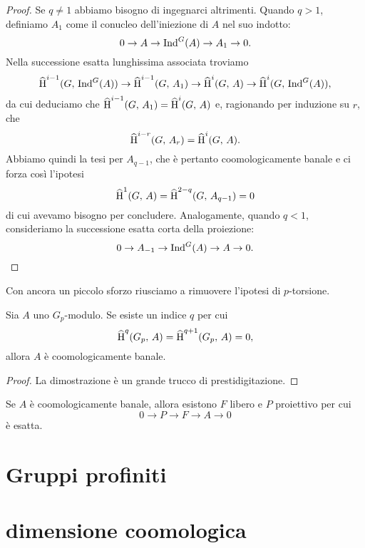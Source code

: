 \begin{proof}
	Se $ q \neq 1 $ abbiamo bisogno di ingegnarci altrimenti. Quando $ q > 1 $, definiamo $ A_1 $ come il conucleo dell'iniezione di $ A $ nel suo indotto:
	\[ 0 \to A \to \operatorname{Ind}^G(A) \to A_1 \to 0. \]
	Nella successione esatta lunghissima associata troviamo
	\[ \operatorname{\widehat{H}}^{i-1}(G, \, \operatorname{Ind}^G(A)) \to \operatorname{\widehat{H}}^{i-1}(G, \, A_1) \to \operatorname{\widehat{H}}^{i}(G, \, A) \to \operatorname{\widehat{H}}^{i}(G, \, \operatorname{Ind}^G(A)),  \]
	da cui deduciamo che $ \operatorname{\widehat{H}}^{i-1}(G, \, A_1) = \operatorname{\widehat{H}}^{i}(G, \, A) $ e, ragionando per induzione su $ r $, che
	\[ \operatorname{\widehat{H}}^{i-r}(G, \, A_r) = \operatorname{\widehat{H}}^{i}(G, \, A). \] 
	Abbiamo quindi la tesi per $ A_{q-1} $, che è pertanto coomologicamente banale e ci forza così l'ipotesi 
	\[ \operatorname{\widehat{H}}^1(G, \, A) = \operatorname{\widehat{H}}^{2-q}(G, \, A_{q-1}) = 0 \]
	di cui avevamo bisogno per concludere.
	Analogamente, quando $ q < 1 $, consideriamo la successione esatta corta della proiezione:
	\[ 0 \to A_{-1} \to \operatorname{Ind}^G(A) \to A \to 0. \]
\end{proof}

Con ancora un piccolo sforzo riusciamo a rimuovere l'ipotesi di $ p $-torsione.

\begin{theorem}
	Sia $ A $ uno $ G_p $-modulo. Se esiste un indice $ q $ per cui
	\[ \operatorname{\widehat{H}}^q(G_p, \, A) = \operatorname{\widehat{H}}^{q+1}(G_p, \, A) = 0, \]
	allora $ A $ è coomologicamente banale.
\end{theorem}

\begin{proof}
	La dimostrazione è un grande trucco di prestidigitazione.
\end{proof}

\begin{corollary}
	Se $ A $ è coomologicamente banale, allora esistono $ F $ libero e $ P $ proiettivo per cui
	\[ 0 \to P \to F \to A \to 0 \]
	è esatta.
\end{corollary}

\section{Gruppi profiniti}

\section{dimensione coomologica}